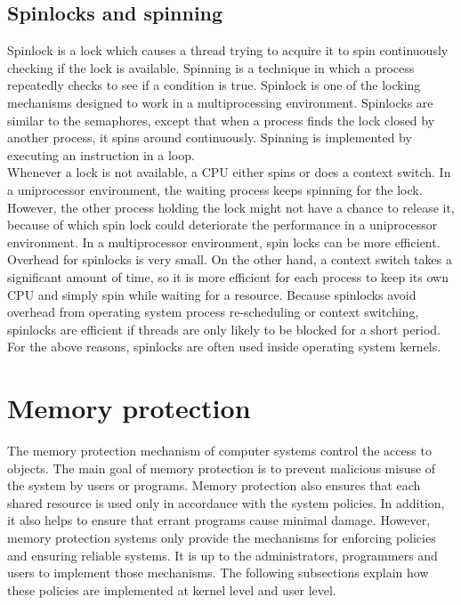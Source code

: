 \subsection{Spinlocks and spinning}

Spinlock is a lock which causes a thread trying to acquire it to spin continuously checking if the lock is available. Spinning is a technique in which a process repeatedly checks to see if a condition is true. Spinlock is one of the locking mechanisms designed to work in a multiprocessing environment. Spinlocks are similar to the semaphores, except that when a process finds the lock closed by another process, it spins around continuously. Spinning is implemented by executing an instruction in a loop. \cite{Bovet:2005:ULK:1077084}
\\
Whenever a lock is not available, a CPU either spins or does a context switch. In a uniprocessor environment, the waiting process keeps spinning for the lock. However, the other process holding the lock might not have a chance to release it, because of which spin lock could deteriorate the performance in a uniprocessor environment. In a multiprocessor environment, spin locks can be more efficient. Overhead for spinlocks is very small. On the other hand, a context switch takes a significant amount of time, so it is more efficient for each process to keep its own CPU and simply spin while waiting for a resource. \cite{Bovet:2005:ULK:1077084} Because spinlocks avoid overhead from operating system process re-scheduling or context switching, spinlocks are efficient if threads are only likely to be blocked for a short period. For the above reasons, spinlocks are often used inside operating system kernels.


\pagebreak

\section{Memory protection}

The memory protection mechanism of computer systems control the access to objects. The main goal of memory protection is to prevent malicious misuse of the system by users or programs. Memory protection also ensures that each shared resource is used only in accordance with the system policies. In addition, it also helps to ensure that errant programs cause minimal damage. However, memory protection systems only provide the mechanisms for enforcing policies and ensuring reliable systems. It is up to the administrators, programmers and users to implement those mechanisms\cite{Galvin, Graham:1971:PPP:1478873.1478928}. The following subsections explain how these policies are implemented at kernel level and user level. 

